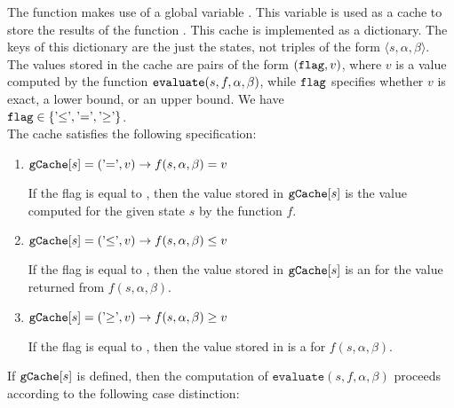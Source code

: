 The function  makes use of a global variable .  This variable is used as a
cache to store the results of the function .  This cache is implemented as a dictionary.  The
keys of this dictionary are the just the states, not triples of the form $\langle s, \alpha, \beta \rangle$.  The values
stored in the cache are pairs of the form $(\texttt{flag}, v)$, where $v$ is a value computed by the
function $\texttt{evaluate}(s, f, \alpha, \beta)$, while $\texttt{flag}$ specifies whether $v$ is exact, a
lower bound, or an upper bound.  We have
\\[0.2cm]
\hspace*{1.3cm}
$\texttt{flag} \in \{ \mbox{'$\leq$'}, \mbox{'$=$'}, \mbox{'$\geq$'}\}$.
\\[0.2cm]
The cache satisfies the following specification:
\begin{enumerate}
\item $\texttt{gCache}[s] = (\mbox{'$=$'}, v) \rightarrow f(s, \alpha, \beta) = v$

      If the flag is equal to \quoted{=}, then the value stored in $\texttt{gCache}[s]$
      is the  value computed for the given state $s$ by the function $f$.
\item $\texttt{gCache}[s] = (\mbox{'$\leq$'}, v) \rightarrow f(s, \alpha, \beta) \leq v$

      If the flag is equal to \quoted{\leq}, then the value stored in $\texttt{gCache}[s]$
      is an  for the value returned from $f(s, \alpha, \beta)$.  

\item $\texttt{gCache}[s] = (\mbox{'$\geq$'}, v) \rightarrow f(s, \alpha, \beta) \geq v$

      If the flag is equal to \quoted{\geq}, then the value stored in 
      is a  for $f(s, \alpha, \beta)$.
\end{enumerate}
If $\texttt{gCache}[s]$ is defined, then the computation of $\texttt{evaluate}(s, f, \alpha, \beta)$
proceeds according to the following case distinction:
